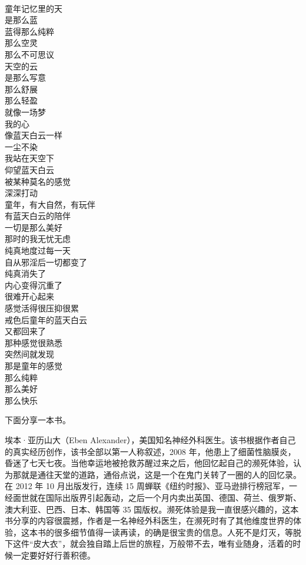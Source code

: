 \begin{poem}[童年的天空]
    \begin{multicols}{4}
        \centering~\\
        童年记忆里的天 \\ 是那么蓝 \\ 蓝得那么纯粹 \\ 那么空灵 \\ 那么不可思议 \\ 天空的云 \\ 是那么写意 \\ 那么舒展 \\ 那么轻盈 \\ 就像一场梦 \\ 我的心 \\ 像蓝天白云一样 \\ 一尘不染 \\ 我站在天空下 \\ 仰望蓝天白云 \\ 被某种莫名的感觉 \\ 深深打动 \\ 童年，有大自然，有玩伴 \\ 有蓝天白云的陪伴 \\ 一切是那么美好 \\ 那时的我无忧无虑 \\ 纯真地度过每一天 \\ 自从邪淫后一切都变了 \\ 纯真消失了 \\ 内心变得沉重了 \\ 很难开心起来 \\ 感觉活得很压抑很累 \\ 戒色后童年的蓝天白云 \\ 又都回来了 \\ 那种感觉很熟悉 \\ 突然间就发现 \\ 那是童年的感觉 \\ 那么纯粹 \\ 那么美好 \\ 那么快乐
    \end{multicols}
\end{poem}

下面分享一本书。

\begin{book}
    埃本·亚历山大（Eben Alexander），美国知名神经外科医生。该书根据作者自己的真实经历创作，该书全部以第一人称叙述，2008 年，他患上了细菌性脑膜炎，昏迷了七天七夜。当他幸运地被抢救苏醒过来之后，他回忆起自己的濒死体验，认为那就是通往天堂的道路，通俗点说，这是一个在鬼门关转了一圈的人的回忆录。在 2012 年 10 月出版发行，连续 15 周蝉联《纽约时报》、亚马逊排行榜冠军，一经面世就在国际出版界引起轰动，之后一个月内卖出英国、德国、荷兰、俄罗斯、澳大利亚、巴西、日本、韩国等 35 国版权。濒死体验是我一直很感兴趣的，这本书分享的内容很震撼，作者是一名神经外科医生，在濒死时有了其他维度世界的体验，这本书的很多细节值得一读再读，的确是很宝贵的信息。人死不是灯灭，等脱下这件“皮大衣”，就会独自踏上后世的旅程，万般带不去，唯有业随身，活着的时候一定要好好行善积德。
\end{book}
